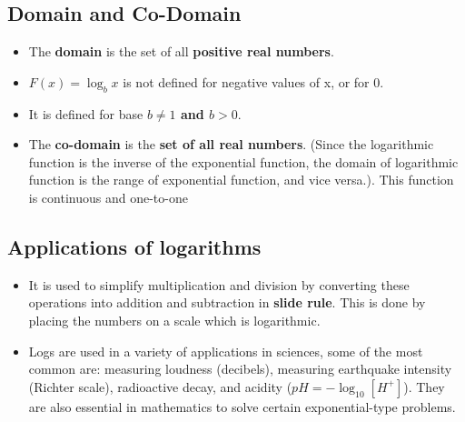 \documentclass[12pt]{report}
\begin{document}
{\subsection{Domain and Co-Domain}
\begin{itemize}
    \item The \textbf{domain} is the set of all \textbf{positive real numbers}.
      \item {$F(x)= \log_b x$} is not defined for negative values of x, or for 0. 
      \item It is defined for base \textbf{$b\neq1$ and $b>0$}. 
      \item The \textbf{co-domain} is the \textbf{set of all real numbers}. (Since the logarithmic function is the inverse of the exponential function, the domain of logarithmic function is the range of exponential function, and vice versa.). This function is continuous and one-to-one
\end{itemize}

    
\subsection{Applications of logarithms}
\begin{itemize}
      \item It is used to simplify multiplication and division by converting these operations into addition and subtraction in \textbf{slide rule}. This is done by placing the numbers on a scale which is logarithmic. \cite{wiki}
      \item Logs are used in a variety of applications in sciences, some of the most common are: measuring loudness (decibels), measuring earthquake intensity (Richter scale), radioactive decay, and acidity ($pH= -\log_{10} [H^+]$). They are also essential in mathematics to solve certain exponential-type problems.
    \end{itemize}
    

}
\end{document}
